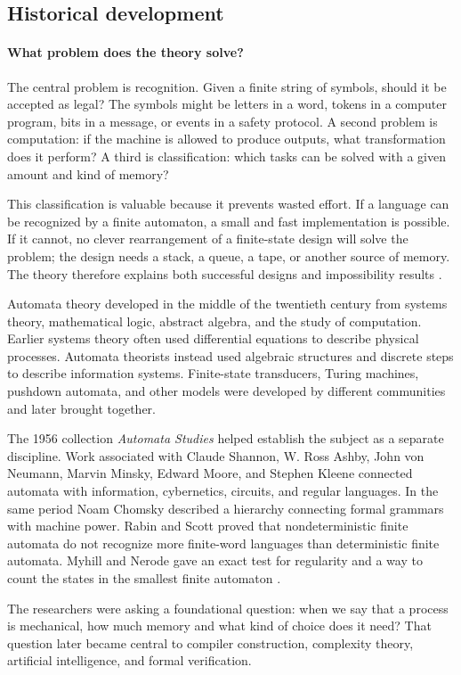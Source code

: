 \subsection*{Historical development}
\begin{historylist}
\paragraph{What problem does the theory solve?}

The central problem is recognition. Given a finite string of symbols, should it be accepted as legal? The symbols might be letters in a word, tokens in a computer program, bits in a message, or events in a safety protocol. A second problem is computation: if the machine is allowed to produce outputs, what transformation does it perform? A third is classification: which tasks can be solved with a given amount and kind of memory?

This classification is valuable because it prevents wasted effort. If a language can be recognized by a finite automaton, a small and fast implementation is possible. If it cannot, no clever rearrangement of a finite-state design will solve the problem; the design needs a stack, a queue, a tape, or another source of memory. The theory therefore explains both successful designs and impossibility results \cite{automata_theory_ref1,automata_theory_ref2}.

Automata theory developed in the middle of the twentieth century from systems theory, mathematical logic, abstract algebra, and the study of computation. Earlier systems theory often used differential equations to describe physical processes. Automata theorists instead used algebraic structures and discrete steps to describe information systems. Finite-state transducers, Turing machines, pushdown automata, and other models were developed by different communities and later brought together.

The 1956 collection \emph{Automata Studies} helped establish the subject as a separate discipline. Work associated with Claude Shannon, W. Ross Ashby, John von Neumann, Marvin Minsky, Edward Moore, and Stephen Kleene connected automata with information, cybernetics, circuits, and regular languages. In the same period Noam Chomsky described a hierarchy connecting formal grammars with machine power. Rabin and Scott proved that nondeterministic finite automata do not recognize more finite-word languages than deterministic finite automata. Myhill and Nerode gave an exact test for regularity and a way to count the states in the smallest finite automaton \cite{automata_theory_ref1,automata_theory_ref3}.

The researchers were asking a foundational question: when we say that a process is mechanical, how much memory and what kind of choice does it need? That question later became central to compiler construction, complexity theory, artificial intelligence, and formal verification.

\end{historylist}
